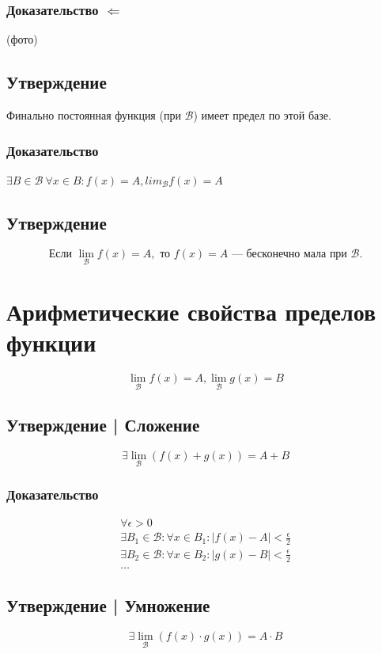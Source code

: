 \documentclass{article}
\begin{document}
\subsubsection{Доказательство $\Leftarrow$}
(фото)

\subsection{Утверждение}
Финально постоянная функция (при $\mathcal{B}$) имеет предел по этой базе.

\subsubsection{Доказательство}
$\exists B \in \mathcal{B}~\forall x \in B: f(x) = A, lim_{\mathcal{B}} f(x) = A$

\subsection{Утверждение}
\[
\text{Если } \lim_{\mathcal{B}} f(x) = A, \text{ то } f(x) = A \text{ --- бесконечно мала при } \mathcal{B}.
\]


\section{Арифметические свойства пределов функции}
\[
    \lim_{\mathcal{B}} f(x) = A, \lim_{\mathcal{B}} g(x) = B
\]

\subsection{Утверждение | Сложение}
\[
    \exists \lim_{\mathcal{B}} (f(x) + g(x)) = A + B
\]

\subsubsection{Доказательство}
\begin{gather*}
    \forall \epsilon > 0 \\
    \exists B_1 \in \mathcal{B}: \forall x \in B_1: |f(x) - A| < \frac{\epsilon}{2} \\
    \exists B_2 \in \mathcal{B}: \forall x \in B_2: |g(x) - B| < \frac{\epsilon}{2} \\
    \dots
\end{gather*}


\subsection{Утверждение | Умножение}
\[
    \exists \lim_{\mathcal{B}} (f(x) \cdot g(x)) = A \cdot B
\]
\end{document}
